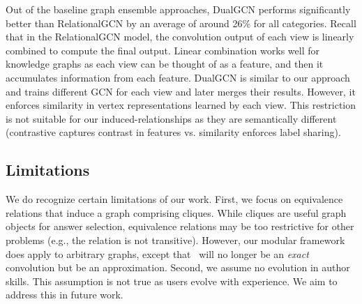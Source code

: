 Out of the baseline graph ensemble approaches, DualGCN performs significantly better than RelationalGCN by an average of around 26\% for all categories. Recall that in the RelationalGCN model, the convolution output of each view is linearly combined to compute the final output. Linear combination works well for knowledge graphs as each view can be thought of as a feature, and then it accumulates information from each feature. DualGCN is similar to our approach and trains different GCN for each view and later merges their results. However, it enforces similarity in vertex representations learned by each view. This restriction is not suitable for our induced-relationships as they are semantically different (contrastive captures contrast in features vs. similarity enforces label sharing).




\vspace{-0.2in}
\subsection{Limitations} We do recognize certain limitations of our work. First, %
we focus on equivalence relations that induce a graph comprising cliques. While cliques are useful graph objects for answer selection, equivalence relations may be too restrictive for other problems (e.g., the relation is not transitive). However, our modular framework does apply to arbitrary graphs, except that~ will no longer be an \emph{exact} convolution but be an approximation. Second, we assume no evolution in author skills. This assumption is not true as users evolve with experience. We aim to address this in future work.











